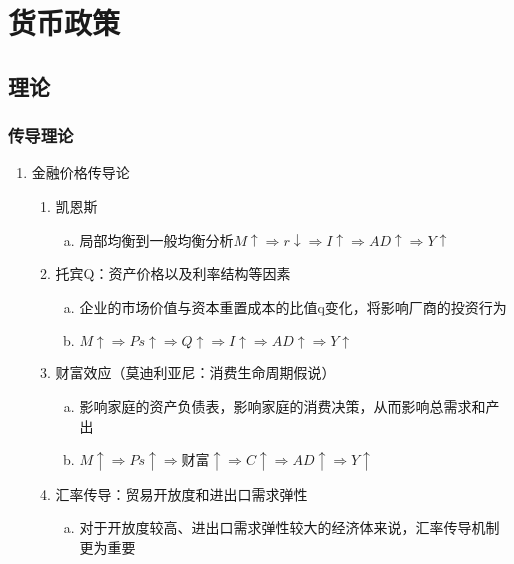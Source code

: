 \documentclass[12pt]{book}
\begin{document}
\chapter{货币政策}


\section{理论}



\subsection{传导理论}

\begin{enumerate}[1.]
  \item 金融价格传导论
        \begin{enumerate}[(1)]
          \item 凯恩斯
                \begin{enumerate}[a.]
                  \item 局部均衡到一般均衡分析$ M\uparrow \Rightarrow r\downarrow \Rightarrow I\uparrow \Rightarrow AD\uparrow \Rightarrow Y\uparrow  $
                \end{enumerate}
          \item 托宾Q：资产价格以及利率结构等因素
                \begin{enumerate}[a.]
                  \item 企业的市场价值与资本重置成本的比值q变化，将影响厂商的投资行为
                  \item $M\uparrow \Rightarrow Ps\uparrow \Rightarrow Q\uparrow \Rightarrow I\uparrow \Rightarrow AD\uparrow \Rightarrow Y\uparrow $
                \end{enumerate}
          \item 财富效应（莫迪利亚尼：消费生命周期假说）
                \begin{enumerate}[a.]
                  \item 影响家庭的资产负债表，影响家庭的消费决策，从而影响总需求和产出
                  \item $M\uparrow \Rightarrow Ps\uparrow\Rightarrow \text{财富}\uparrow\Rightarrow C\uparrow \Rightarrow AD\uparrow\Rightarrow Y\uparrow $
                \end{enumerate}
          \item 汇率传导：贸易开放度和进出口需求弹性
                \begin{enumerate}[a.]
                  \item 对于开放度较高、进出口需求弹性较大的经济体来说，汇率传导机制更为重要

\end{enumerate}
\end{enumerate}
\end{enumerate}
\end{document}
